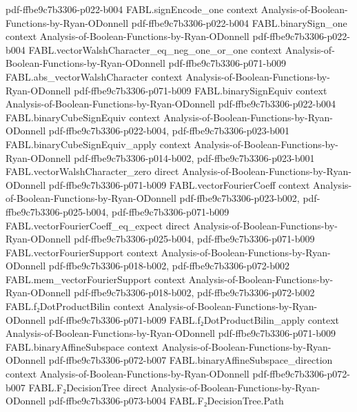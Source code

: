 \begin{theorem}
  {pdf-ffbe9c7b3306-p022-b004}
\proofstep
  {FABL.signEncode_one}
  {context}
  {Analysis-of-Boolean-Functions-by-Ryan-ODonnell}
  {pdf-ffbe9c7b3306-p022-b004}
\proofstep
  {FABL.binarySign_one}
  {context}
  {Analysis-of-Boolean-Functions-by-Ryan-ODonnell}
  {pdf-ffbe9c7b3306-p022-b004}
\proofstep
  {FABL.vectorWalshCharacter_eq_neg_one_or_one}
  {context}
  {Analysis-of-Boolean-Functions-by-Ryan-ODonnell}
  {pdf-ffbe9c7b3306-p071-b009}
\proofstep
  {FABL.abs_vectorWalshCharacter}
  {context}
  {Analysis-of-Boolean-Functions-by-Ryan-ODonnell}
  {pdf-ffbe9c7b3306-p071-b009}
\proofstep
  {FABL.binarySignEquiv}
  {context}
  {Analysis-of-Boolean-Functions-by-Ryan-ODonnell}
  {pdf-ffbe9c7b3306-p022-b004}
\proofstep
  {FABL.binaryCubeSignEquiv}
  {context}
  {Analysis-of-Boolean-Functions-by-Ryan-ODonnell}
  {pdf-ffbe9c7b3306-p022-b004,
    pdf-ffbe9c7b3306-p023-b001}
\proofstep
  {FABL.binaryCubeSignEquiv_apply}
  {context}
  {Analysis-of-Boolean-Functions-by-Ryan-ODonnell}
  {pdf-ffbe9c7b3306-p014-b002,
    pdf-ffbe9c7b3306-p023-b001}
\proofstep
  {FABL.vectorWalshCharacter_zero}
  {direct}
  {Analysis-of-Boolean-Functions-by-Ryan-ODonnell}
  {pdf-ffbe9c7b3306-p071-b009}
\proofstep
  {FABL.vectorFourierCoeff}
  {context}
  {Analysis-of-Boolean-Functions-by-Ryan-ODonnell}
  {pdf-ffbe9c7b3306-p023-b002,
    pdf-ffbe9c7b3306-p025-b004,
    pdf-ffbe9c7b3306-p071-b009}
\proofstep
  {FABL.vectorFourierCoeff_eq_expect}
  {direct}
  {Analysis-of-Boolean-Functions-by-Ryan-ODonnell}
  {pdf-ffbe9c7b3306-p025-b004,
    pdf-ffbe9c7b3306-p071-b009}
\proofstep
  {FABL.vectorFourierSupport}
  {context}
  {Analysis-of-Boolean-Functions-by-Ryan-ODonnell}
  {pdf-ffbe9c7b3306-p018-b002,
    pdf-ffbe9c7b3306-p072-b002}
\proofstep
  {FABL.mem_vectorFourierSupport}
  {context}
  {Analysis-of-Boolean-Functions-by-Ryan-ODonnell}
  {pdf-ffbe9c7b3306-p018-b002,
    pdf-ffbe9c7b3306-p072-b002}
\proofstep
  {FABL.f₂DotProductBilin}
  {context}
  {Analysis-of-Boolean-Functions-by-Ryan-ODonnell}
  {pdf-ffbe9c7b3306-p071-b009}
\proofstep
  {FABL.f₂DotProductBilin_apply}
  {context}
  {Analysis-of-Boolean-Functions-by-Ryan-ODonnell}
  {pdf-ffbe9c7b3306-p071-b009}
\proofstep
  {FABL.binaryAffineSubspace}
  {context}
  {Analysis-of-Boolean-Functions-by-Ryan-ODonnell}
  {pdf-ffbe9c7b3306-p072-b007}
\proofstep
  {FABL.binaryAffineSubspace_direction}
  {context}
  {Analysis-of-Boolean-Functions-by-Ryan-ODonnell}
  {pdf-ffbe9c7b3306-p072-b007}
\proofstep
  {FABL.F₂DecisionTree}
  {direct}
  {Analysis-of-Boolean-Functions-by-Ryan-ODonnell}
  {pdf-ffbe9c7b3306-p073-b004}
\proofstep
  {FABL.F₂DecisionTree.Path}

\end{theorem}
